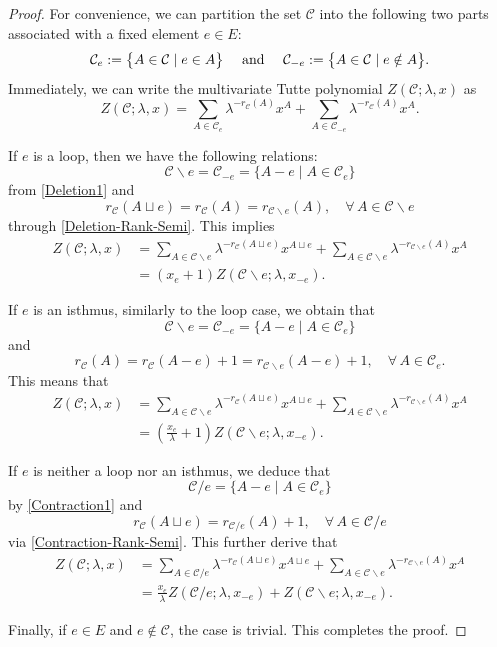 \documentclass[12pt]{article}%
\renewcommand*{\bm}[1]{#1}%
\numberwithin{equation}{section}
\def\And{\mbox{\rm ~and~}}
\begin{document}
\begin{proof}
For convenience, we can partition the set $\mathcal{C}$ into the following two parts associated with a fixed element $e\in E$: 
\[
\mathcal{C}_e:=\big\{A\in\mathcal{C}\mid e\in A\big\}\quad\And\quad\mathcal{C}_{-e}:=\big\{A\in\mathcal{C}\mid e\notin A\big\}.
\]
Immediately,  we can write the multivariate Tutte polynomial $Z(\mathcal{C};\lambda,\bm x)$ as
\[
Z(\mathcal{C};\lambda,\bm x)=\sum_{A\in\mathcal{C}_e}\lambda^{-r_\mathcal{C}(A)}\bm x^A+\sum_{A\in\mathcal{C}_{-e}}\lambda^{-r_\mathcal{C}(A)}\bm x^A.
\]

If $e$ is a loop, then we have the following relations:
\[
\mathcal{C}\backslash e=\mathcal{C}_{-e}=\big\{A-e\mid A\in \mathcal{C}_e\big\}
\]
from \eqref{Deletion1} and
\[
r_{\mathcal{C}}(A\sqcup e)=r_{\mathcal{C}}(A)=r_{\mathcal{C}\backslash e}(A),\quad\forall\, A\in \mathcal{C}\backslash e
\]
through \eqref{Deletion-Rank-Semi}. This implies
\begin{align*}
Z(\mathcal{C};\lambda,\bm x)&=\sum_{A\in\mathcal{C}\backslash e}\lambda^{-r_\mathcal{C}(A\sqcup e)}\bm x^{A\sqcup e}+\sum_{A\in\mathcal{C}\backslash e}\lambda^{-r_{\mathcal{C}\backslash e}(A)}\bm x^A\\
&=(x_e+1)Z(\mathcal{C}\backslash e;\lambda,\bm x_{-e}).
\end{align*}

If $e$ is an isthmus, similarly to the loop case, we obtain that
\[
\mathcal{C}\backslash e=\mathcal{C}_{-e}=\big\{A-e\mid A\in \mathcal{C}_e\big\}
\]
and
\[
r_{\mathcal{C}}(A)=r_{\mathcal{C}}(A-e)+1=r_{\mathcal{C}\backslash e}(A-e)+1,\quad\forall\, A\in \mathcal{C}_e.
\]
This means that
\begin{align*}
Z(\mathcal{C};\lambda,\bm x)&=\sum_{A\in\mathcal{C}\backslash e}\lambda^{-r_\mathcal{C}(A\sqcup e)}\bm x^{A\sqcup e}+\sum_{A\in\mathcal{C}\backslash e}\lambda^{-r_{\mathcal{C}\backslash e}(A)}\bm x^A\\
&=(\frac{x_e}{\lambda}+1)Z(\mathcal{C}\backslash e;\lambda,\bm x_{-e}).
\end{align*}

If $e$ is neither a loop nor an isthmus, we deduce that
\[
\mathcal{C}/e=\big\{A-e\mid A\in \mathcal{C}_e\big\}
\]
by \eqref{Contraction1} and
\[
r_{\mathcal{C}}(A\sqcup e)=r_{\mathcal{C}/e}(A)+1,\quad\forall\, A\in \mathcal{C}/e
\]
via \eqref{Contraction-Rank-Semi}. This further derive that 
\begin{align*}
Z(\mathcal{C};\lambda,\bm x)&=\sum_{A\in\mathcal{C}/ e}\lambda^{-r_\mathcal{C}(A\sqcup e)}\bm x^{A\sqcup e}+\sum_{A\in\mathcal{C}\backslash e}\lambda^{-r_{\mathcal{C}\backslash e}(A)}\bm x^A\\
&=\frac{x_e}{\lambda}Z(\mathcal{C}/e;\lambda,\bm x_{-e})+Z(\mathcal{C}\backslash e;\lambda,\bm x_{-e}).
\end{align*}

Finally, if $e\in E$ and $e\notin\mathcal{C}$, the case is trivial. This completes the proof.
\end{proof}
\end{document}
